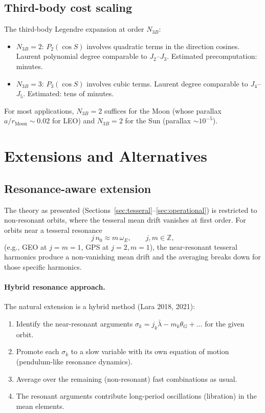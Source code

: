 \documentclass[11pt]{article}
\begin{document}
\subsection{Third-body cost scaling}

The third-body Legendre expansion at order $N_{3B}$:
\begin{itemize}
\item $N_{3B} = 2$: $P_2(\cos S)$ involves quadratic terms in the
direction cosines. Laurent polynomial degree comparable to $J_2$--$J_3$.
Estimated precomputation: minutes.
\item $N_{3B} = 3$: $P_3(\cos S)$ involves cubic terms. Laurent degree
comparable to $J_4$--$J_5$. Estimated: tens of minutes.
\end{itemize}

For most applications, $N_{3B} = 2$ suffices for the Moon (whose parallax
$a/r_{\text{Moon}} \sim 0.02$ for LEO) and $N_{3B} = 2$ for the Sun
(parallax $\sim 10^{-5}$).


\section{Extensions and Alternatives}
\label{sec:extensions}

\subsection{Resonance-aware extension}
\label{sec:resonance}

The theory as presented (Sections~\ref{sec:tesseral}--\ref{sec:operational})
is restricted to non-resonant orbits, where the tesseral mean drift vanishes
at first order. For orbits near a tesseral resonance
\begin{equation}
j\, n_0 \approx m\, \omega_E,
\qquad j, m \in \mathbb Z,
\end{equation}
(e.g., GEO at $j = m = 1$, GPS at $j = 2, m = 1$), the
near-resonant tesseral harmonics produce a non-vanishing mean drift and
the averaging breaks down for those specific harmonics.

\paragraph{Hybrid resonance approach.}
The natural extension is a hybrid method (Lara 2018, 2021):
\begin{enumerate}
\item Identify the near-resonant arguments
$\sigma_k = j_k \bar\lambda - m_k \theta_G + \ldots$ for the given orbit.
\item Promote each $\sigma_k$ to a slow variable with its own equation of
motion (pendulum-like resonance dynamics).
\item Average over the remaining (non-resonant) fast combinations as usual.
\item The resonant arguments contribute long-period oscillations
(libration) in the mean elements.
\end{enumerate}
\end{document}
